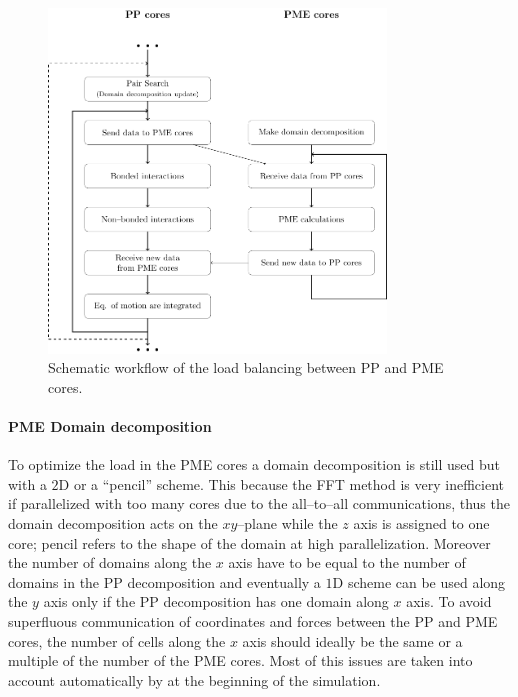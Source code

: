 \begin{figure}[h!t]
	\centering
	\includegraphics[width=0.8\textwidth]{./img/Schemi/PPPMECores}
	\caption{Schematic workflow of the load balancing between \acs{PP} and \acs{PME} cores.}
	\label{fig:PPPMECores}
\end{figure}

\paragraph{\textbf{PME Domain decomposition}} To optimize the load in the \ac{PME} cores a domain decomposition 
is still used but with a $2$D or a ``pencil'' scheme. This because the \ac{FFT} method is very inefficient if 
parallelized with too many cores due to the all--to--all communications, thus the domain decomposition acts on 
the $xy$--plane while the $z$ axis is assigned to one core; pencil refers to the shape of the domain at high 
parallelization. Moreover the number of domains along the $x$ axis have to be equal to the number of domains in 
the \ac{PP} decomposition and eventually a $1$D scheme can be used along the $y$ axis only if the \ac{PP} 
decomposition has one domain along $x$ axis. To avoid superfluous communication of coordinates and forces between 
the \ac{PP} and \ac{PME} cores, the number of cells along the $x$ axis should ideally be the same or a multiple 
of the number of the \ac{PME} cores. Most of this issues are taken into account automatically by \gromacs at the 
beginning of the simulation.

